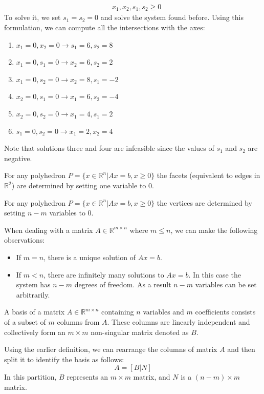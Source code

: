\begin{example}
\begin{align*}
                                    &\: x_1,x_2,s_1,s_2 \geq 0
    \end{align*}
    To solve it, we set $s_1=s_2=0$ and solve the system found before.
    Using this formulation, we can compute all the intersections with the axes:
    \begin{enumerate}
        \item $x_1=0,x_2=0 \rightarrow s_1=6,s_2=8$
        \item $x_1=0,s_1=0 \rightarrow x_2=6,s_2=2$
        \item $x_1=0,s_2=0 \rightarrow x_2=8,s_1=-2$
        \item $x_2=0,s_1=0 \rightarrow x_1=6,s_2=-4$
        \item $x_2=0,s_2=0 \rightarrow x_1=4,s_1=2$
        \item $s_1=0,s_2=0 \rightarrow x_1=2,x_2=4$
    \end{enumerate}
    Note that solutions three and four are infeasible since the values of $s_1$ and $s_2$ are negative. 
\end{example}
\begin{property}
    For any polyhedron $P = \{x \in \mathbb{R}^n|Ax = b,x \geq 0\}$ the facets (equivalent to edges in $\mathbb{R}^2$) are determined by setting one variable to 0. 
\end{property}
\begin{property}   
    For any polyhedron $P = \{x \in \mathbb{R}^n|Ax = b,x \geq 0\}$ the vertices are determined by setting $n-m$ variables to 0. 
\end{property}

When dealing with a matrix  $A \in \mathbb{R}^{m \times n}$ where $m \leq n$, we can make the following observations:
\begin{itemize}
    \item If $m=n$, there is a unique solution of $Ax = b$.
    \item If $m<n$, there are infinitely many solutions to $Ax = b$. 
        In this case the system has $n-m$ degrees of freedom. 
        As a result $n-m$ variables can be set arbitrarily. 
\end{itemize}
\begin{definition}
    A basis of a matrix $A \in \mathbb{R}^{m \times n}$ containing $n$ variables and $m$ coefficients consists of a subset of $m$ columns from $A$. 
    These columns are linearly independent and collectively form an $m \times m$ non-singular matrix denoted as $B$. 
\end{definition}
Using the earlier definition, we can rearrange the columns of matrix $A$ and then split it to identify the basis as follows:
\[A=\left[ B|N \right]\]
In this partition, $B$ represents an $m \times m$ matrix, and $N$ is a $(n-m) \times m$ matrix.

